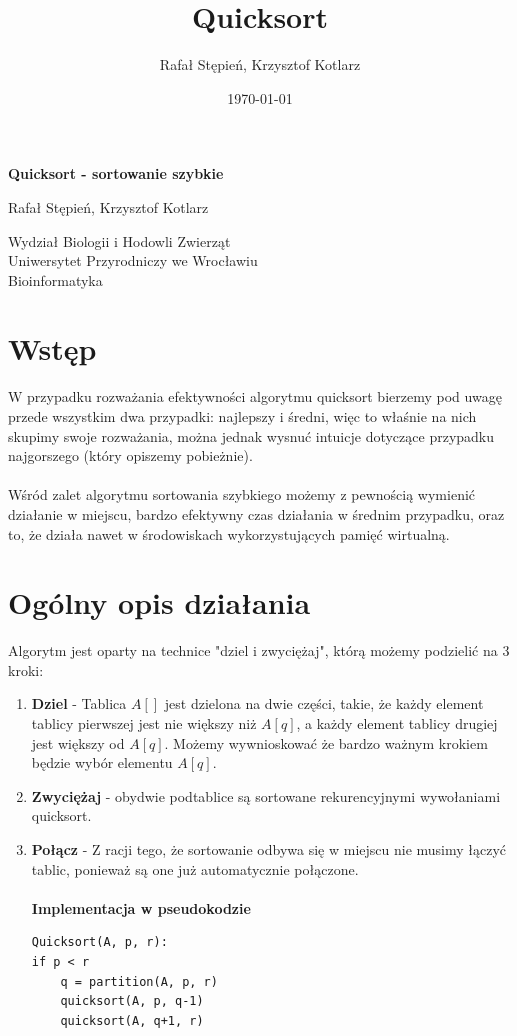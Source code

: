 \documentclass[12pt]{article}
\title{Quicksort}
\author{Rafał Stępień, Krzysztof Kotlarz}
\date{\today}
\begin{document}
\begin{titlepage}
   \begin{center}
       \vspace*{1cm}
 
       \textbf{\huge{Quicksort - sortowanie szybkie}}
 
       \vspace{1.5cm}
 
       Rafał Stępień, Krzysztof Kotlarz \\
       \vspace{2cm}

 
       Wydział Biologii i Hodowli Zwierząt\\
       Uniwersytet Przyrodniczy we Wrocławiu\\
       Bioinformatyka\\
 
   \end{center}
\end{titlepage}
\newpage
\tableofcontents
\newpage
\section{Wstęp}
\hspace{10pt} W przypadku rozważania efektywności algorytmu quicksort bierzemy pod uwagę przede wszystkim dwa przypadki: najlepszy i średni, więc to właśnie na nich skupimy swoje rozważania, można jednak wysnuć intuicje dotyczące przypadku najgorszego (który opiszemy pobieżnie).\\
\\
Wśród zalet algorytmu sortowania szybkiego możemy z pewnością wymienić działanie w miejscu, bardzo efektywny czas działania w średnim przypadku, oraz to, że działa nawet w środowiskach wykorzystujących pamięć wirtualną.
\section{Ogólny opis działania}
Algorytm jest oparty na technice "dziel i zwyciężaj", którą możemy podzielić na 3 kroki:
\begin{enumerate}
\item \textbf{Dziel} - Tablica $A[]$ jest dzielona na dwie części, takie, że każdy element tablicy pierwszej jest nie większy niż $A[q]$, a każdy element tablicy drugiej jest większy od $A[q]$. Możemy wywnioskować że bardzo ważnym krokiem będzie wybór elementu $A[q]$.
\item \textbf{Zwyciężaj} - obydwie podtablice są sortowane rekurencyjnymi wywołaniami quicksort.
\item \textbf{Połącz} - Z racji tego, że sortowanie odbywa się w miejscu nie musimy łączyć tablic, ponieważ są one już automatycznie połączone.\\
\\
\textbf{{\Large Implementacja w pseudokodzie}}
\begin{Verbatim}
Quicksort(A, p, r):
if p < r
	q = partition(A, p, r)
	quicksort(A, p, q-1)
	quicksort(A, q+1, r)
\end{Verbatim}
\end{enumerate}
\end{document}
